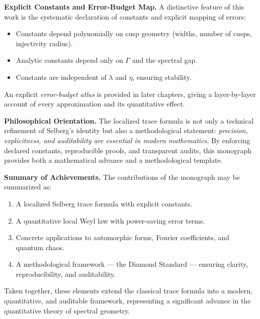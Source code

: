 \medskip
\noindent\textbf{Explicit Constants and Error-Budget Map.}
A distinctive feature of this work is the systematic declaration of constants
and explicit mapping of errors:
\begin{itemize}
  \item Constants depend polynomially on cusp geometry (widths, number of cusps,
  injectivity radius).
  \item Analytic constants depend only on $\Gamma$ and the spectral gap.
  \item Constants are independent of $\lambda$ and $\eta$, ensuring stability.
\end{itemize}
An explicit \emph{error-budget atlas} is provided in later chapters, giving a
layer-by-layer account of every approximation and its quantitative effect.

\medskip
\noindent\textbf{Philosophical Orientation.}
The localized trace formula is not only a technical refinement of Selberg’s
identity but also a methodological statement: \emph{precision, explicitness,
and auditability are essential in modern mathematics}. By enforcing declared
constants, reproducible proofs, and transparent audits, this monograph
provides both a mathematical advance and a methodological template.

\medskip
\noindent\textbf{Summary of Achievements.}
The contributions of the monograph may be summarized as:
\begin{enumerate}
  \item A localized Selberg trace formula with explicit constants.  
  \item A quantitative local Weyl law with power-saving error terms.  
  \item Concrete applications to automorphic forms, Fourier coefficients, and
  quantum chaos.  
  \item A methodological framework --- the Diamond Standard --- ensuring
  clarity, reproducibility, and auditability.  
\end{enumerate}
Taken together, these elements extend the classical trace formula into a
modern, quantitative, and auditable framework, representing a significant
advance in the quantitative theory of spectral geometry.

